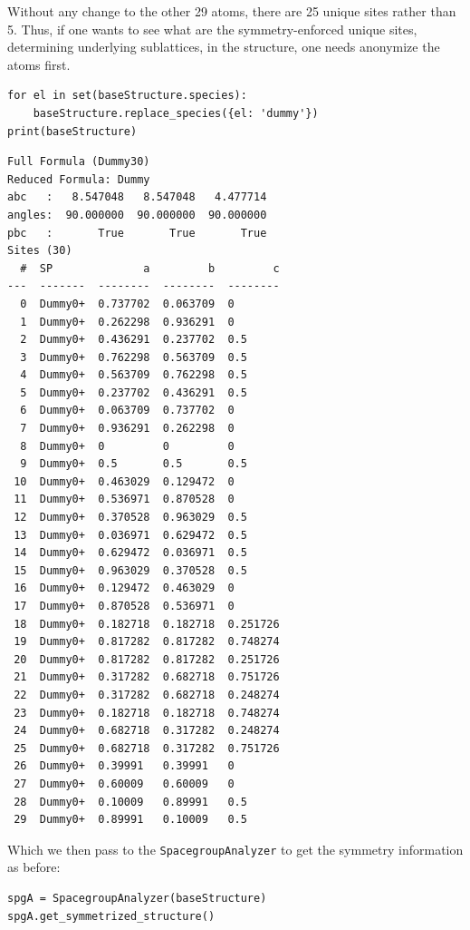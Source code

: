 Without any change to the other 29 atoms, there are 25 unique sites
rather than 5. Thus, if one wants to see what are the symmetry-enforced
unique sites, determining underlying sublattices, in the structure, one
needs anonymize the atoms first.

\begin{verbatim}
for el in set(baseStructure.species):
    baseStructure.replace_species({el: 'dummy'})
print(baseStructure)
\end{verbatim}

\begin{verbatim}
Full Formula (Dummy30)
Reduced Formula: Dummy
abc   :   8.547048   8.547048   4.477714
angles:  90.000000  90.000000  90.000000
pbc   :       True       True       True
Sites (30)
  #  SP              a         b         c
---  -------  --------  --------  --------
  0  Dummy0+  0.737702  0.063709  0
  1  Dummy0+  0.262298  0.936291  0
  2  Dummy0+  0.436291  0.237702  0.5
  3  Dummy0+  0.762298  0.563709  0.5
  4  Dummy0+  0.563709  0.762298  0.5
  5  Dummy0+  0.237702  0.436291  0.5
  6  Dummy0+  0.063709  0.737702  0
  7  Dummy0+  0.936291  0.262298  0
  8  Dummy0+  0         0         0
  9  Dummy0+  0.5       0.5       0.5
 10  Dummy0+  0.463029  0.129472  0
 11  Dummy0+  0.536971  0.870528  0
 12  Dummy0+  0.370528  0.963029  0.5
 13  Dummy0+  0.036971  0.629472  0.5
 14  Dummy0+  0.629472  0.036971  0.5
 15  Dummy0+  0.963029  0.370528  0.5
 16  Dummy0+  0.129472  0.463029  0
 17  Dummy0+  0.870528  0.536971  0
 18  Dummy0+  0.182718  0.182718  0.251726
 19  Dummy0+  0.817282  0.817282  0.748274
 20  Dummy0+  0.817282  0.817282  0.251726
 21  Dummy0+  0.317282  0.682718  0.751726
 22  Dummy0+  0.317282  0.682718  0.248274
 23  Dummy0+  0.182718  0.182718  0.748274
 24  Dummy0+  0.682718  0.317282  0.248274
 25  Dummy0+  0.682718  0.317282  0.751726
 26  Dummy0+  0.39991   0.39991   0
 27  Dummy0+  0.60009   0.60009   0
 28  Dummy0+  0.10009   0.89991   0.5
 29  Dummy0+  0.89991   0.10009   0.5
\end{verbatim}

Which we then pass to the \texttt{SpacegroupAnalyzer}
to get the symmetry information as before:

\begin{verbatim}
spgA = SpacegroupAnalyzer(baseStructure)
spgA.get_symmetrized_structure()
\end{verbatim}

